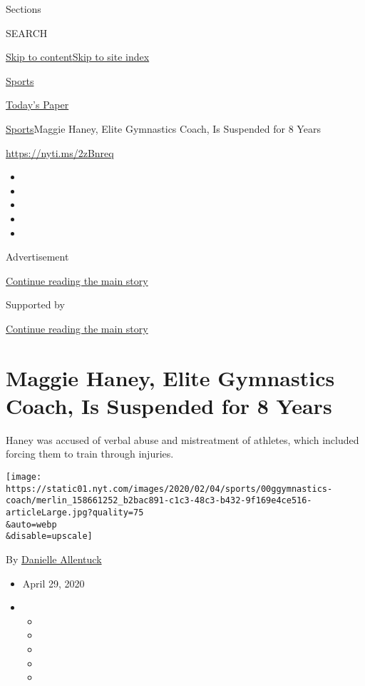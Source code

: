 Sections

SEARCH

\protect\hyperlink{site-content}{Skip to
content}\protect\hyperlink{site-index}{Skip to site index}

\href{https://www.nytimes.com/section/sports}{Sports}

\href{https://myaccount.nytimes.com/auth/login?response_type=cookie\&client_id=vi}{}

\href{https://www.nytimes.com/section/todayspaper}{Today's Paper}

\href{/section/sports}{Sports}\textbar{}Maggie Haney, Elite Gymnastics
Coach, Is Suspended for 8 Years

\url{https://nyti.ms/2zBnreq}

\begin{itemize}
\item
\item
\item
\item
\item
\end{itemize}

Advertisement

\protect\hyperlink{after-top}{Continue reading the main story}

Supported by

\protect\hyperlink{after-sponsor}{Continue reading the main story}

\hypertarget{maggie-haney-elite-gymnastics-coach-is-suspended-for-8-years}{%
\section{Maggie Haney, Elite Gymnastics Coach, Is Suspended for 8
Years}\label{maggie-haney-elite-gymnastics-coach-is-suspended-for-8-years}}

Haney was accused of verbal abuse and mistreatment of athletes, which
included forcing them to train through injuries.

\texttt{[image: https://static01.nyt.com/images/2020/02/04/sports/00ggymnastics-coach/merlin\_158661252\_b2bac891-c1c3-48c3-b432-9f169e4ce516-articleLarge.jpg?quality=75\\\&auto=webp\\\&disable=upscale]}

By \href{https://www.nytimes.com/by/danielle-allentuck}{Danielle
Allentuck}

\begin{itemize}
\item
  April 29, 2020
\item
  \begin{itemize}
  \item
  \item
  \item
  \item
  \item
  \end{itemize}
\end{itemize}

